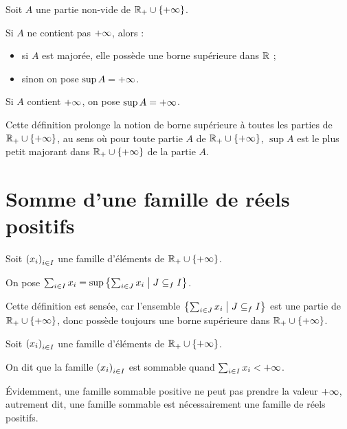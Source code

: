 \begin{defi}
Soit \(A\) une partie non-vide de \(\mathbb{R}_+\cup\left\lbrace+\infty\right\rbrace\).

Si \(A\) ne contient pas \(+\infty\), alors :

\begin{itemize}
    \item si \(A\) est majorée, elle possède une borne supérieure dans \(\mathbb{R}\) ; \\
    \item sinon on pose \(\sup A=+\infty\).
\end{itemize}

Si \(A\) contient \(+\infty\), on pose \(\sup A=+\infty\).
\end{defi}

Cette définition prolonge la notion de borne supérieure à toutes les parties de \(\mathbb{R}_+\cup\left\lbrace+\infty\right\rbrace\), au sens où pour toute partie \(A\) de \(\mathbb{R}_+\cup\left\lbrace+\infty\right\rbrace\), \(\sup A\) est le plus petit majorant dans \(\mathbb{R}_+\cup\left\lbrace+\infty\right\rbrace\) de la partie \(A\).

\section{Somme d'une famille de réels positifs}

\begin{defi}
Soit \(\left(x_i\right)_{i\in I}\) une famille d'éléments de \(\mathbb{R}_+\cup\left\lbrace+\infty\right\rbrace\).

On pose \(\sum_{i\in I}x_i=\sup\left\lbrace\sum_{i\in J}x_i\;\middle|\; J\subseteq_fI\right\rbrace\).
\end{defi}

\begin{rem}
Cette définition est sensée, car l'ensemble \(\left\lbrace\sum_{i\in J}x_i\;\middle|\; J\subseteq_fI\right\rbrace\) est une partie de \(\mathbb{R}_+\cup\left\lbrace+\infty\right\rbrace\), donc possède toujours une borne supérieure dans \(\mathbb{R}_+\cup\left\lbrace+\infty\right\rbrace\).
\end{rem}

\begin{defi}
Soit \(\left(x_i\right)_{i\in I}\) une famille d'éléments de \(\mathbb{R}_+\cup\left\lbrace+\infty\right\rbrace\).

On dit que la famille \(\left(x_i\right)_{i\in I}\) est sommable quand \(\sum_{i\in I}x_i<+\infty\).
\end{defi}

Évidemment, une famille sommable positive ne peut pas prendre la valeur \(+\infty\), autrement dit, une famille sommable est nécessairement une famille de réels positifs.

